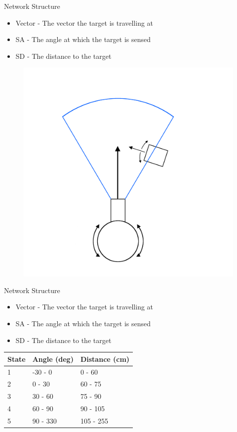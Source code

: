 \begin{frame}{Network Structure}
\begin{itemize}
 \item Vector - The vector the target is travelling at
 \item SA - The angle at which the target is sensed
 \item SD - The distance to the target
\end{itemize}

\begin{figure}
  \includegraphics[scale=0.2]{figures/richPic3P5.PNG}
\end{figure}
\end{frame}


\begin{frame}{Network Structure}
\begin{itemize}
 \item Vector - The vector the target is travelling at
 \item SA - The angle at which the target is sensed
 \item SD - The distance to the target
\end{itemize}

\begin{table}
\begin{tabular}{l|l|l}
State & Angle (deg) & Distance (cm) \\ \hline
1     & -30 - 0     & 0 - 60        \\
2     & 0 - 30      & 60 - 75       \\
3     & 30 - 60     & 75 - 90       \\
4     & 60 - 90     & 90 - 105      \\
5     & 90 - 330    & 105 - 255     
\end{tabular}
\end{table}
\end{frame}

